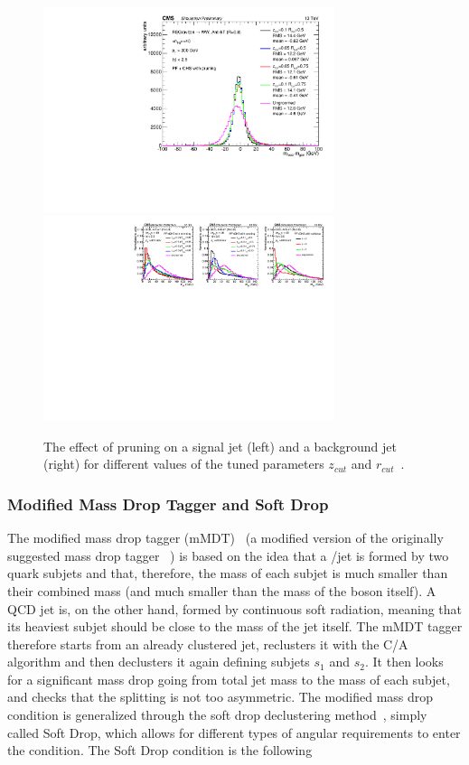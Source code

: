 \begin{figure}[ht] 
    \centering
    \includegraphics[height=6cm]{figures/event_reconstruction/sig_pruning.pdf}
    \includegraphics[height=6cm]{figures/event_reconstruction/bkg_pruning-noData.pdf}
    \caption{The effect of pruning on a signal jet (left) and a background jet (right) for different values of the tuned parameters $z_{cut}$ and $r_{cut}$~\cite{CMS-PAS-JME-14-001}.}
    \label{fig:objreco:pruning}
\end{figure}



\subsubsection{Modified Mass Drop Tagger and Soft Drop}

The modified mass drop tagger (mMDT)~\cite{Dasgupta:2013ihk} (a modified version of the originally suggested mass drop tagger ~\cite{Butterworth:2008iy}) is based on the idea that a \PW/\PZ jet is formed by two quark subjets and that, therefore, the mass of each subjet is much smaller than their combined mass (and much smaller than the mass of the boson itself). A QCD jet is, on the other hand, formed by continuous soft radiation, meaning that its heaviest subjet should be close to the mass of the jet itself. The mMDT tagger therefore starts from an already clustered jet, reclusters it with the C/A algorithm and then declusters it again defining subjets $s_1$ and $s_2$. It then looks for a significant mass drop going from total jet mass to the mass of each subjet, and checks that the splitting is not too asymmetric. The modified mass drop condition is generalized through the soft drop declustering method~\cite{Larkoski:2014wba}, simply called Soft Drop, which allows for different types of angular requirements to enter the condition. The Soft Drop condition is the following

